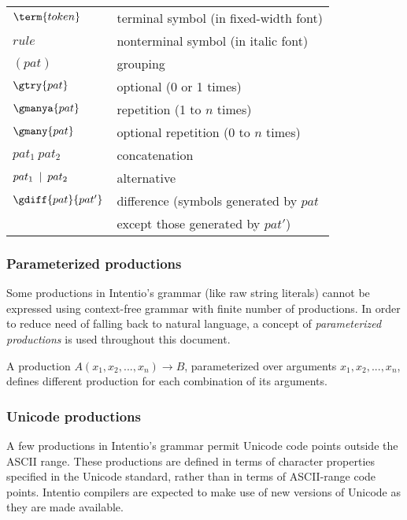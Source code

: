\begin{bnfutils}
\begin{center}
\begin{tabular}[t]{ll}
  \(\term{token}\)        & terminal symbol (in fixed-width font) \\
  \(rule\)                & nonterminal symbol (in italic font) \\
  \((pat)\)               & grouping \\
  \(\gtry{pat}\)          & optional (0 or 1 times) \\
  \(\gmanya{pat}\)        & repetition (1 to \(n\) times) \\
  \(\gmany{pat}\)         & optional repetition (0 to \(n\) times) \\
  \(pat_1 \ pat_2\)       & concatenation \\
  \(pat_1 \hskip0.5em\relax | \hskip0.5em\relax pat_2\)    & alternative \\
  \(\gdiff{pat}{pat'}\)   & difference (symbols generated by \(pat\) \\
                          & except those generated by \(pat'\))
\end{tabular}
\end{center}
\end{bnfutils}

\subsubsection*{Parameterized productions}

Some productions in Intentio's grammar (like raw string literals) cannot be expressed using context-free grammar with finite number of productions. In order to reduce need of falling back to natural language, a concept of \emph{parameterized productions} is used throughout this document.

A production \(A(x_1, x_2, ..., x_n) \rightarrow B\), parameterized over arguments \(x_1, x_2, ..., x_n\), defines different production for each combination of its arguments.

\subsubsection*{Unicode productions}

A few productions in Intentio's grammar permit Unicode\cite{Unicode} code points outside the ASCII range. These productions are defined in terms of character properties specified in the Unicode standard, rather than in terms of ASCII-range code points. Intentio compilers are expected to make use of new versions of Unicode as they are made available.

